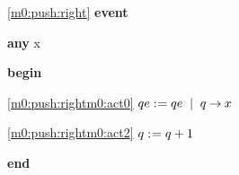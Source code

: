 \noindent \ref{m0:push:right}  \textbf{event}
\begin{block}
  \item   \textbf{any} x
  \item   \textbf{begin}
  \begin{block}
  \item[ \eqref{m0:push:rightm0:act0} ]$qe \mathrel{:\mkern1mu=} qe \; \; | \; \; q \mathbin\rightarrow x $ %
  \item[ \eqref{m0:push:rightm0:act2} ]$q \mathrel{:\mkern1mu=} q+1 $ %
  \end{block}
  \item   \textbf{end} \\
\end{block}
